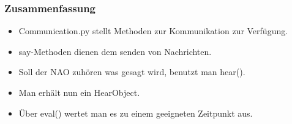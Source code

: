 \frame
{
  \frametitle{Zusammenfassung}

  \begin{itemize}
    \item<1-> Communication.py stellt Methoden zur Kommunikation zur Verf\"ugung.
    \item<2-> say-Methoden dienen dem senden von Nachrichten.
    \item<3-> Soll der NAO zuh\"oren was gesagt wird, benutzt man hear().
    \item<4-> Man erh\"alt nun ein HearObject.
    \item<5-> \"Uber eval() wertet man es zu einem geeigneten Zeitpunkt aus.
  \end{itemize}
}